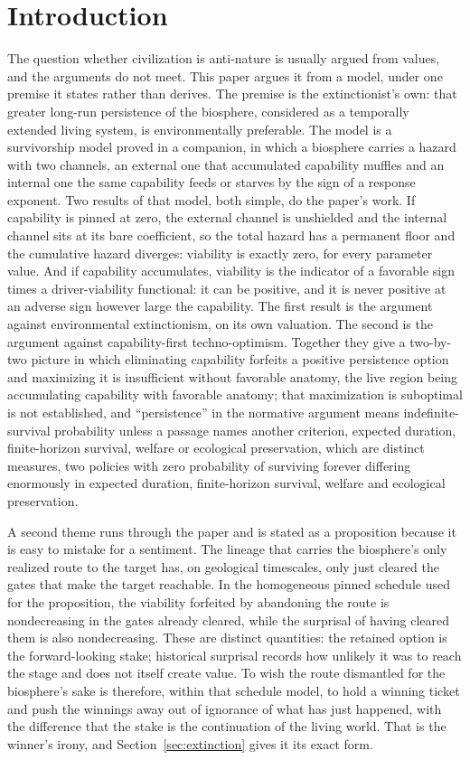 \section{Introduction}\label{sec:intro}

The question whether civilization is anti-nature is usually argued from
values, and the arguments do not meet. This paper argues it from a
model, under one premise it states rather than derives. The premise is
the extinctionist's own: that greater long-run persistence of the
biosphere, considered as a temporally extended living system, is
environmentally preferable. The model is a survivorship model proved in
a companion, in which a biosphere carries a hazard with two channels, an
external one that accumulated capability muffles and an internal one the
same capability feeds or starves by the sign of a response exponent. Two
results of that model, both simple, do the paper's work. If capability
is pinned at zero, the external channel is unshielded and the internal
channel sits at its bare coefficient, so the total hazard has a
permanent floor and the cumulative hazard diverges: viability is
exactly zero, for every parameter value. And if capability accumulates,
viability is the indicator of a favorable sign times a driver-viability
functional: it can be positive, and it is never positive at an adverse
sign however large the capability. The first result is the argument
against environmental extinctionism, on its own valuation. The second
is the argument against capability-first techno-optimism. Together they give a two-by-two picture in which eliminating capability forfeits a positive persistence option and maximizing it is insufficient without favorable anatomy, the live region being accumulating capability with favorable anatomy; that maximization is suboptimal is not established, and ``persistence'' in the normative argument means indefinite-survival probability unless a passage names another criterion, expected duration, finite-horizon survival, welfare or ecological preservation, which are distinct measures, two policies with zero probability of surviving forever differing enormously in expected duration, finite-horizon survival, welfare and ecological preservation.

A second theme runs through the paper and is stated as a proposition
because it is easy to mistake for a sentiment. The lineage that carries
the biosphere's only realized route to the target has, on geological
timescales, only just cleared the gates that make the target reachable.
In the homogeneous pinned schedule used for the proposition, the
viability forfeited by abandoning the route is nondecreasing in the
gates already cleared, while the surprisal of having cleared them is
also nondecreasing. These are distinct quantities: the retained option
is the forward-looking stake; historical surprisal records how unlikely
it was to reach the stage and does not itself create value. To wish the
route dismantled for the biosphere's sake is therefore, within that
schedule model, to hold a winning ticket and push the winnings away out
of ignorance of what has just happened, with the difference that the
stake is the continuation of the living world. That is the winner's
irony, and Section~\ref{sec:extinction} gives it its exact form.

